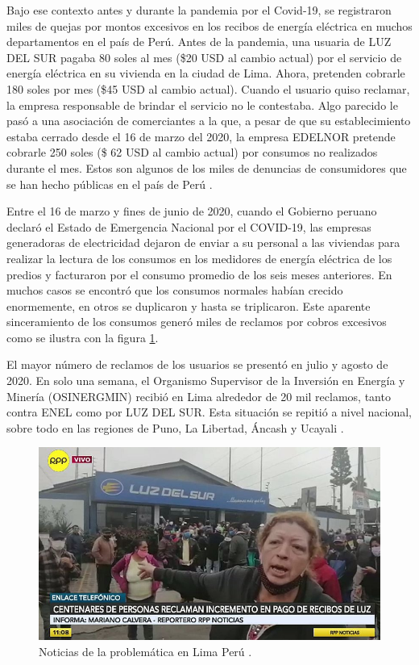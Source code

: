 Bajo ese contexto antes y durante la pandemia por el Covid-19, se registraron miles de quejas por montos excesivos en los recibos de energía eléctrica en muchos departamentos en el país de Perú. Antes de la pandemia, una usuaria de LUZ DEL SUR pagaba 80 soles al mes (\$20 USD al cambio actual) por el servicio de energía eléctrica en su vivienda en la ciudad de Lima. Ahora, pretenden cobrarle 180 soles por mes (\$45 USD al cambio actual). Cuando el usuario quiso reclamar, la empresa responsable de brindar el servicio no le contestaba. Algo parecido le pasó a una asociación de comerciantes a la que, a pesar de que su establecimiento estaba cerrado desde el 16 de marzo del 2020, la empresa EDELNOR pretende cobrarle 250 soles (\$ 62 USD al cambio actual) por consumos no realizados durante el mes. Estos son algunos de los miles de denuncias de consumidores que se han hecho públicas en el país de Perú  \citep{WEBSITE:1}.

Entre el 16 de marzo y fines de junio de 2020, cuando el Gobierno peruano declaró el Estado de Emergencia Nacional por el COVID-19, las empresas generadoras de electricidad dejaron de enviar a su personal a las viviendas para realizar la lectura de los consumos en los medidores de energía eléctrica de los predios y facturaron por el consumo promedio de los seis meses anteriores. En muchos casos se encontró que los consumos normales habían crecido enormemente, en otros se duplicaron y hasta se triplicaron. Este aparente sinceramiento de los consumos generó miles de reclamos por cobros excesivos como se ilustra con la figura \ref{fig:noticia}. 

El mayor número de reclamos de los usuarios se presentó en julio y agosto de 2020. En solo una semana, el Organismo Supervisor de la Inversión en Energía y Minería (OSINERGMIN) recibió en Lima alrededor de 20 mil reclamos, tanto contra ENEL como por LUZ DEL SUR. Esta situación se repitió a nivel nacional, sobre todo en las regiones de Puno, La Libertad, Áncash y Ucayali \citep{WEBSITE:1}.

\begin{figure}[htbp]
\centering
\includegraphics[width=.7\textwidth]{./Figures/motivacion.jpg}
\caption{Noticias de la problemática en Lima Perú \protect\footnotemark.}
\label{fig:noticia}
\end{figure}

